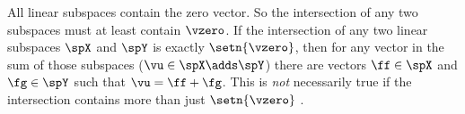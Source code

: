 All linear subspaces contain the zero vector.
So the intersection of any two subspaces must at least contain $\vzero$.
If the intersection of any two linear subspaces $\spX$ and $\spY$ is exactly $\setn{\vzero}$, 
then for any vector in
the sum of those subspaces ($\vu\in\spX\adds\spY$) there are  vectors $\ff\in\spX$ and 
$\fg\in\spY$ such that $\vu=\ff+\fg$.
This is \emph{not} necessarily true if the intersection contains more than just $\setn{\vzero}$
.


%
%
